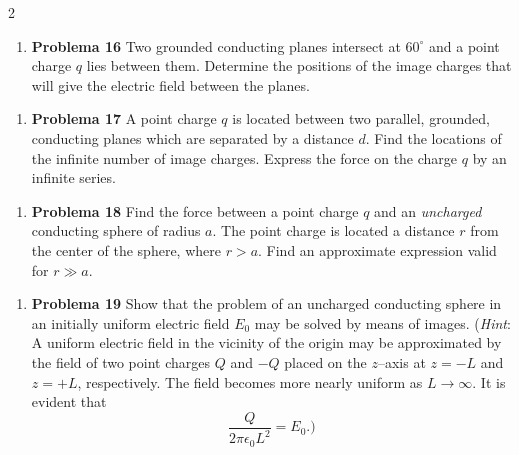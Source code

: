 \documentclass{article}
\begin{document}
\begin{multicols}{2}
\begin{enumerate}[label={{\textcolor{trueblue}{\textbf{Pr.} \arabic*.16}}}, start=3]
\item \textbf{Problema 16} Two grounded conducting planes intersect at $60^{\circ}$ and a point charge $q$ lies between them. Determine the positions of the image charges that will give the electric field between the planes.
\end{enumerate}

\begin{enumerate}[label={{\textcolor{trueblue}{\textbf{Pr.} \arabic*.17}}}, start=3]
\item \textbf{Problema 17} A point charge $q$ is located between two parallel, grounded, conducting planes which are separated by a distance $d$. Find the locations of the infinite number of image charges. Express the force on the charge $q$ by an infinite series.
\end{enumerate}

\begin{enumerate}[label={{\textcolor{trueblue}{\textbf{Pr.} \arabic*.18}}}, start=3]
\item \textbf{Problema 18} Find the force between a point charge $q$ and an \emph{uncharged} conducting sphere of radius $a$. The point charge is located a distance $r$ from the center of the sphere, where $r > a$. Find an approximate expression valid for $r \gg a$.
\end{enumerate}

\begin{enumerate}[label={{\textcolor{trueblue}{\textbf{Pr.} \arabic*.19}}}, start=3]
\item \textbf{Problema 19} Show that the problem of an uncharged conducting sphere in an initially uniform electric field $E_{0}$ may be solved by means of images. (\emph{Hint}: A uniform electric field in the vicinity of the origin may be approximated by the field of two point charges $Q$ and $-Q$ placed on the $z$–axis at $z=-L$ and $z=+L$, respectively. The field becomes more nearly uniform as $L \to \infty$. It is evident that
\[
\frac{Q}{2\pi \epsilon_{0} L^{2}} = E_{0}.)
\]
\end{enumerate}


\end{multicols}
\end{document}
